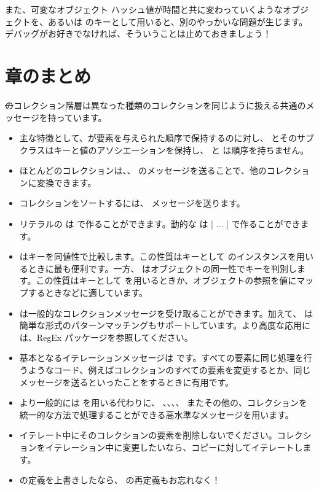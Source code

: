 \documentclass[a4paper,10pt,twoside]{book}
\begin{document}
また、可変なオブジェクト \ie ハッシュ値が時間と共に変わっていくようなオブジェクトを、あるいは  のキーとして用いると、別のやっかいな問題が生じます。デバッグがお好きでなければ、そういうことは止めておきましょう！

\section{章のまとめ}

\st のコレクション階層は異なった種類のコレクションを同じように扱える共通のメッセージを持っています。

\begin{itemize}
  \item 主な特徴として、が要素を与えられた順序で保持するのに対し、 とそのサブクラスはキーと値のアソシエーションを保持し、 と は順序を持ちません。
  \item ほとんどのコレクションは、、 \etc のメッセージを送ることで、他のコレクションに変換できます。
  \item コレクションをソートするには、 メッセージを送ります。
  \item リテラルの  は  で作ることができます。動的な  は \ct|{ ... }| で作ることができます。
  \item {} はキーを同値性で比較します。この性質はキーとして  のインスタンスを用いるときに最も便利です。一方、 はオブジェクトの同一性でキーを判別します。この性質はキーとして  を用いるときか、オブジェクトの参照を値にマップするときなどに適しています。
  \item {} は一般的なコレクションメッセージを受け取ることができます。加えて、 は簡単な形式のパターンマッチングもサポートしています。より高度な応用には、RegEx パッケージを参照してください。
  \item 基本となるイテレーションメッセージは  です。すべての要素に同じ処理を行うようなコード、例えばコレクションのすべての要素を変更するとか、同じメッセージを送るといったことをするときに有用です。
  \item より一般的には  を用いる代わりに、 、、、、 またその他の、コレクションを統一的な方法で処理することができる高水準なメッセージを用います。
  \item イテレート中にそのコレクションの要素を削除しないでください。コレクションをイテレーション中に変更したいなら、コピーに対してイテレートします。
  \item \ct{=} の定義を上書きしたなら、 の再定義もお忘れなく！
\end{itemize}

\ifx\wholebook\relax\else
   
   
\end{document}
